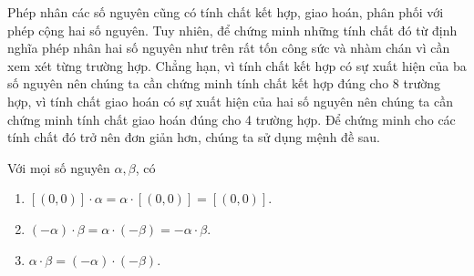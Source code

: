 Phép nhân các số nguyên cũng có tính chất kết hợp, giao hoán, phân phối với phép cộng hai số nguyên. Tuy nhiên, để chứng minh những tính chất đó từ định nghĩa phép nhân hai số nguyên như trên rất tốn công sức và nhàm chán vì cần xem xét từng trường hợp. Chẳng hạn, vì tính chất kết hợp có sự xuất hiện của ba số nguyên nên chúng ta cần chứng minh tính chất kết hợp đúng cho 8 trường hợp, vì tính chất giao hoán có sự xuất hiện của hai số nguyên nên chúng ta cần chứng minh tính chất giao hoán đúng cho 4 trường hợp. Để chứng minh cho các tính chất đó trở nên đơn giản hơn, chúng ta sử dụng mệnh đề sau.
\begin{proposition}\label{proposition:sign}
	Với mọi số nguyên $\alpha, \beta$, có
	\begin{enumerate}[label={(\roman*)}]
		\item $[(0, 0)]\cdot\alpha = \alpha\cdot[(0,0)] = [(0,0)]$.
		\item $(-\alpha)\cdot\beta = \alpha\cdot(-\beta) = -\alpha\cdot\beta$.
		\item $\alpha\cdot\beta = (-\alpha)\cdot(-\beta)$.
	\end{enumerate}
\end{proposition}

